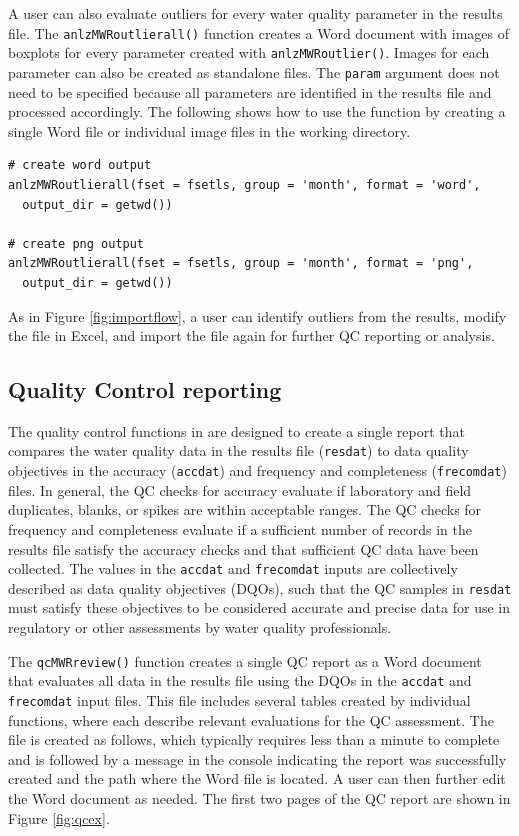 A user can also evaluate outliers for every water quality parameter in the results file. The \texttt{anlzMWRoutlierall()} function creates a Word document with images of boxplots for every parameter created with \texttt{anlzMWRoutlier()}. Images for each parameter can also be created as standalone files. The \texttt{param} argument does not need to be specified because all parameters are identified in the results file and processed accordingly. The following shows how to use the function by creating a single Word file or individual image files in the working directory.

\begin{verbatim}
# create word output
anlzMWRoutlierall(fset = fsetls, group = 'month', format = 'word', 
  output_dir = getwd())

# create png output
anlzMWRoutlierall(fset = fsetls, group = 'month', format = 'png', 
  output_dir = getwd())
\end{verbatim}

As in Figure \ref{fig:importflow}, a user can identify outliers from the results, modify the file in Excel, and import the file again for further QC reporting or analysis.

\hypertarget{quality-control-reporting}{%
\subsection{Quality Control reporting}\label{quality-control-reporting}}

The quality control functions in  are designed to create a single report that compares the water quality data in the results file (\texttt{resdat}) to data quality objectives in the accuracy (\texttt{accdat}) and frequency and completeness (\texttt{frecomdat}) files. In general, the QC checks for accuracy evaluate if laboratory and field duplicates, blanks, or spikes are within acceptable ranges. The QC checks for frequency and completeness evaluate if a sufficient number of records in the results file satisfy the accuracy checks and that sufficient QC data have been collected. The values in the \texttt{accdat} and \texttt{frecomdat} inputs are collectively described as data quality objectives (DQOs), such that the QC samples in \texttt{resdat} must satisfy these objectives to be considered accurate and precise data for use in regulatory or other assessments by water quality professionals.

The \texttt{qcMWRreview()} function creates a single QC report as a Word document that evaluates all data in the results file using the DQOs in the \texttt{accdat} and \texttt{frecomdat} input files. This file includes several tables created by individual  functions, where each describe relevant evaluations for the QC assessment. The file is created as follows, which typically requires less than a minute to complete and is followed by a message in the console indicating the report was successfully created and the path where the Word file is located. A user can then further edit the Word document as needed. The first two pages of the QC report are shown in Figure \ref{fig:qcex}.

